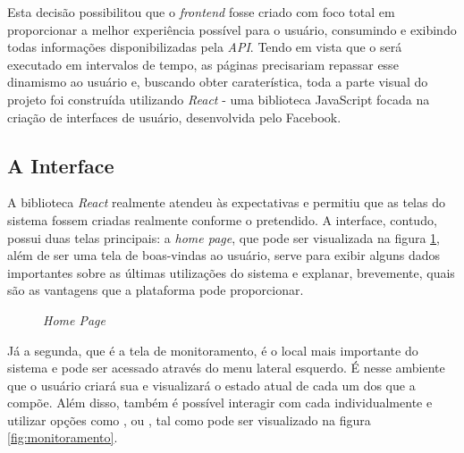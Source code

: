 Esta decisão possibilitou que o \textit{frontend} fosse criado com foco total em proporcionar a melhor experiência possível para o usuário, consumindo e exibindo todas informações disponibilizadas pela \textit{API}. Tendo em vista que o \adaptive{}será executado em intervalos de tempo, as páginas precisariam repassar esse dinamismo ao usuário e, buscando obter caraterística, toda a parte visual do projeto foi construída utilizando \textit{React} - uma biblioteca JavaScript focada na criação de interfaces de usuário, desenvolvida pelo Facebook.


\subsection{A Interface}
\label{sec:a_interface}

A biblioteca \textit{React} realmente atendeu às expectativas e permitiu que as telas do sistema fossem criadas realmente conforme o pretendido. A interface, contudo, possui duas telas principais: a \textit{home page}, que pode ser visualizada na figura \ref{fig:home_page}, além de ser uma tela de boas-vindas ao usuário, serve para exibir alguns dados importantes sobre as últimas utilizações do sistema e explanar, brevemente, quais são as vantagens que a plataforma pode proporcionar.

\begin{figure}[H]
    \centering
    \caption{\textit{Home Page}}
    \label{fig:home_page}
\end{figure}

Já a segunda, que é a tela de monitoramento, é o local mais importante do sistema e pode ser acessado através do menu lateral esquerdo. É nesse ambiente que o usuário criará sua \dockerNetwork{} e visualizará o estado atual de cada um dos \containers{} que a compõe. Além disso, também é possível interagir com cada \conteiner{} individualmente e utilizar opções como ,  ou , tal como pode ser visualizado na figura \ref{fig:monitoramento}.

